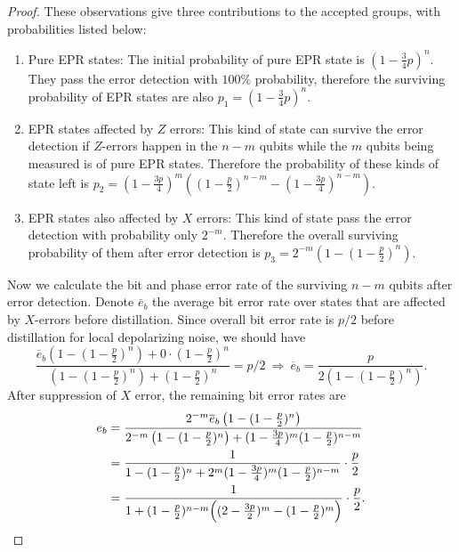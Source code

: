 \documentclass[onecolumn,prx,longbibliography,nofootinbib, superscriptaddress]{revtex4-2}
\theoremstyle{recap}
\begin{document}
\begin{proof}
    These observations give three contributions to the accepted groups, with probabilities listed below:
    \begin{enumerate}
        \item Pure EPR states: The initial probability of pure EPR state is $(1-\frac{3}{4}p)^{n}$. They pass the error detection with $100\%$ probability, therefore the surviving probability of EPR states are also $p_1=(1-\frac{3}{4}p)^{n}$.
        \item EPR states affected by $Z$ errors: This kind of state can survive the error detection if $Z$-errors happen in the $n-m$ qubits while the $m$ qubits being measured is of pure EPR states. Therefore the probability of these kinds of state left is $p_2=(1-\frac{3p}{4})^{m}\left((1-\frac{p}{2})^{n-m}-(1-\frac{3p}{4})^{n-m}\right)$.
        \item EPR states also affected by $X$ errors: This kind of state pass the error detection with probability only $2^{-m}$. Therefore the overall surviving probability of them after error detection is $p_3=2^{-m}\left(1-(1-\frac{p}{2})^{n}\right)$.
    \end{enumerate}
    Now we calculate the bit and phase error rate of the surviving $n-m$ qubits after error detection. Denote $\overline{e}_b$ the average bit error rate over states that are affected by $X$-errors before distillation. Since overall bit error rate is $p/2$ before distillation for local depolarizing noise, we should have
    \begin{equation}
        \frac{\overline{e}_b\left(1-(1-\frac{p}{2})^{n}\right)+0\cdot(1-\frac{p}{2})^{n}}{\left(1-(1-\frac{p}{2})^{n}\right)+(1-\frac{p}{2})^{n}}=p/2~\Rightarrow~\overline{e}_b=\frac{p}{2\left(1-(1-\frac{p}{2})^{n}\right)}.
    \end{equation}
    After suppression of $X$ error, the remaining bit error rates are
    \begin{equation}\label{eq:eb}
    \begin{split}
        e_b&=\frac{2^{-m}\overline{e}_b\left(1-(1-\frac{p}{2})^{n}\right)}{2^{-m}\left(1-(1-\frac{p}{2})^{n}\right)+(1-\frac{3p}{4})^{m}(1-\frac{p}{2})^{n-m}}\\
        &=\frac{1}{1-(1-\frac{p}{2})^{n}+2^{m}(1-\frac{3p}{4})^{m}(1-\frac{p}{2})^{n-m}}\cdot\frac{p}{2}\\
        &=\frac{1}{1+(1-\frac{p}{2})^{n-m}\Bigl((2-\frac{3p}{2})^{m}-(1-\frac{p}{2})^{m}\Bigr)}\cdot\frac{p}{2}.
    \end{split}
    \end{equation}

\end{proof}
\end{document}
